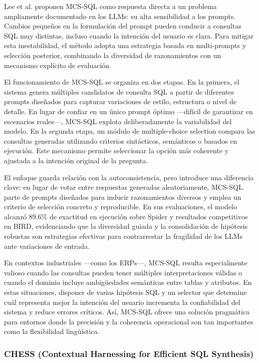 \documentclass[journal]{IEEEtran}
\begin{document}
Lee et al. \cite{lee2024mcs} proponen MCS-SQL como respuesta directa a un problema ampliamente documentado en los LLMs: su alta sensibilidad a los prompts. Cambios pequeños en la formulación del prompt pueden conducir a consultas SQL muy distintas, incluso cuando la intención del usuario es clara. Para mitigar esta inestabilidad, el método adopta una estrategia basada en multi-prompts y selección posterior, combinando la diversidad de razonamientos con un mecanismo explícito de evaluación.

El funcionamiento de MCS-SQL se organiza en dos etapas. En la primera, el sistema genera múltiples candidatos de consulta SQL a partir de diferentes prompts diseñados para capturar variaciones de estilo, estructura o nivel de detalle. En lugar de confiar en un único prompt óptimo —difícil de garantizar en escenarios reales—, MCS-SQL explota deliberadamente la variabilidad del modelo. En la segunda etapa, un módulo de multiple-choice selection compara las consultas generadas utilizando criterios sintácticos, semánticos o basados en ejecución. Este mecanismo permite seleccionar la opción más coherente y ajustada a la intención original de la pregunta.

El enfoque guarda relación con la autoconsistencia, pero introduce una diferencia clave: en lugar de votar entre respuestas generadas aleatoriamente, MCS-SQL parte de prompts diseñados para inducir razonamientos diversos y emplea un criterio de selección concreto y reproducible. En sus evaluaciones, el modelo alcanzó 89.6\% de exactitud en ejecución sobre Spider y resultados competitivos en BIRD, evidenciando que la diversidad guiada y la consolidación de hipótesis robustas son estrategias efectivas para contrarrestar la fragilidad de los LLMs ante variaciones de entrada.

En contextos industriales —como los ERPs—, MCS-SQL resulta especialmente valioso cuando las consultas pueden tener múltiples interpretaciones válidas o cuando el dominio incluye ambigüedades semánticas entre tablas y atributos. En estas situaciones, disponer de varias hipótesis SQL y un selector que determine cuál representa mejor la intención del usuario incrementa la confiabilidad del sistema y reduce errores críticos. Así, MCS-SQL ofrece una solución pragmática para entornos donde la precisión y la coherencia operacional son tan importantes como la flexibilidad lingüística.

\subsubsection{CHESS (Contextual Harnessing for Efficient SQL Synthesis)}
\end{document}

